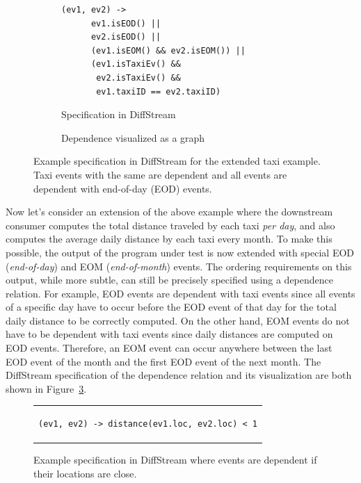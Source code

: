 \begin{figure}[t]
  \centering \footnotesize{}
  \begin{subfigure}[b]{0.56\textwidth}
    \centering
    \begin{lstlisting}[basicstyle=\ttfamily\small,linewidth=7.3cm]
  (ev1, ev2) ->
      ev1.isEOD() ||
      ev2.isEOD() ||
      (ev1.isEOM() && ev2.isEOM()) ||
      (ev1.isTaxiEv() &&
       ev2.isTaxiEv() &&
       ev1.taxiID == ev2.taxiID)
    \end{lstlisting}
    \caption{Specification in DiffStream}
    \label{diffstream:fig:extended-taxi-example-dependency-spec}
  \end{subfigure}%
  \qquad
  \begin{subfigure}[b]{0.36\textwidth}
    \centering
    \caption{Dependence visualized as a graph}
    \label{diffstream:fig:extended-taxi-example-dependency-vis}
  \end{subfigure}
  \caption[DiffStream example specification 2.]{Example specification in DiffStream for the extended taxi example. Taxi events with the same  are dependent
      and all events are dependent with end-of-day (EOD) events.}
  \label{diffstream:fig:extended-example-dependencies}
\end{figure}

Now let's consider an extension of the above example where the downstream consumer
computes the total distance traveled by each taxi \emph{per
  day}, and also computes the average daily distance by each taxi
every month. To make this possible, the output of the program under test
is now
extended with special EOD (\emph{end-of-day}) and EOM (\emph{end-of-month})
events. The ordering requirements on this output, while more subtle, can still be
precisely specified using a dependence relation.
For example, EOD events are dependent with taxi events since all events of a specific day have to occur before the EOD event of that day for the total daily distance to be correctly computed. On the other hand, EOM events do not have to be dependent with taxi events since daily distances are computed on EOD events. Therefore, an EOM event can occur anywhere between the last EOD event of the month and the first EOD event of the next month.
The DiffStream specification of the dependence relation and its visualization are both shown in Figure~\ref{diffstream:fig:extended-example-dependencies}.

\begin{figure}[t]
  \centering \footnotesize{}
\begin{tabular}{c}
\begin{lstlisting}[basicstyle=\ttfamily\small,linewidth=9cm]
  (ev1, ev2) -> distance(ev1.loc, ev2.loc) < 1
\end{lstlisting}
\end{tabular}
  \caption[DiffStream example specification 3.]{Example specification in DiffStream where  events are dependent if their locations are close.}
  \label{diffstream:fig:proximity-example-dependencies}
\end{figure}

